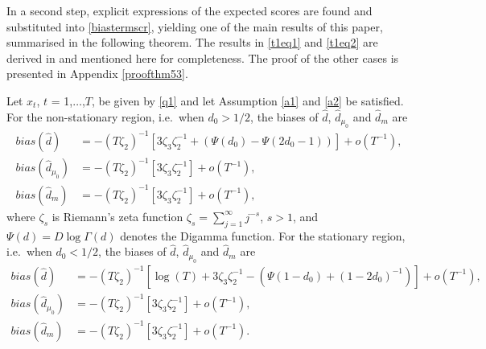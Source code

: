 {{In a second step, explicit expressions of the expected scores are found and substituted into \eqref{biastermscr}, yielding one of the main results of this paper, summarised in the following theorem. The results in \eqref{t1eq1} and \eqref{t1eq2} are derived in \textcite[Theorem 4]{johansen2016role} and mentioned here for completeness. The proof of the other cases is presented in Appendix \ref{proofthm53}.
\begin{theorem}\label{t1} 
Let $x_t$, $t$ = 1,$\ldots$,$T$, be given by \eqref{q1} and let Assumption \ref{a1} and \ref{a2} be satisfied. For the non-stationary region, i.e.\ when $d_0 > 1/2$, the biases of $\hat{d}$, $\hat{d}_{\mu_0}$ and $\hat{d}_{m}$ are
\begin{align}
    bias(\hat{d}) &= -(T \zeta_{2})^{-1}\left[ 3 \zeta_{3} \zeta_{2}^{-1} + (\Psi(d_0) - \Psi(2d_0-1) ) \right] + o(T^{-1}), \label{t1eq1}\\
    bias(\hat{d}_{\mu_0}) &= -(T \zeta_{2})^{-1}\left[ 3 \zeta_{3} \zeta_{2}^{-1}\right] + o(T^{-1}),\label{t1eq2}\\
    bias(\hat{d}_{m}) &= -(T \zeta_{2})^{-1}\left[ 3 \zeta_{3} \zeta_{2}^{-1}\right] + o(T^{-1}),\label{t1eq3}
\end{align}
where  $\zeta_{s}$ is Riemann's zeta function $\zeta_{s} = \sum_{j = 1}^{\infty} j^{-s}$, $s>1$, and $\Psi(d) = D\log \Gamma(d)$ denotes the Digamma function. For the stationary region, i.e.\ when $d_0 < 1/2$, the biases of $\hat{d}$, $\hat{d}_{\mu_0}$ and $\hat{d}_{m}$ are
\begin{align}
    bias(\hat{d}) &= -(T \zeta_{2})^{-1}\left[\log(T) + 3 \zeta_{3} \zeta_{2}^{-1} - ( \Psi(1-d_0)+(1-2d_0)^{-1})  \right] + o(T^{-1}), \label{t2eq1} \\
    bias(\hat{d}_{\mu_0}) &= -(T \zeta_{2})^{-1}\left[ 3 \zeta_{3} \zeta_{2}^{-1}\right] +  o(T^{-1}),\label{t2eq2}\\
    bias(\hat{d}_{m}) &= -(T \zeta_{2})^{-1}\left[ 3 \zeta_{3} \zeta_{2}^{-1}\right] + o(T^{-1}).\label{t2eq3}
\end{align} 
\end{theorem} 
}}
